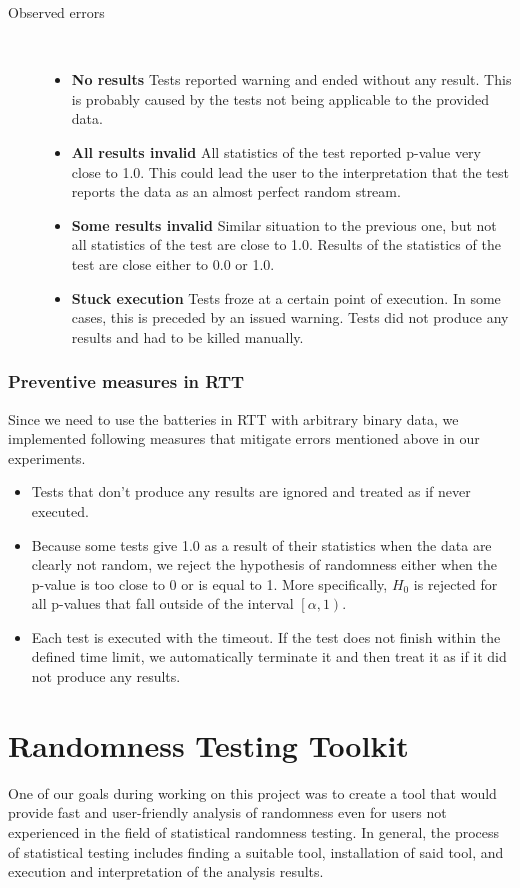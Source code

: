 \documentclass[
	digital,    %
	oneside,
	color,
	11pt,
	nocover,
	notable,
	nolof,
	nolot,
]{fithesis3}
\newenvironment{titlemize}[1]
{
	\begin{description}
	\item[#1]\
	\begin{itemize}
}
{
	\end{itemize}
 	\end{description}
}
\theoremstyle{definition}
\theoremstyle{remark}
\begin{document}
\begin{titlemize}{Observed errors}
\item \textbf{No results} Tests reported warning and ended without any result. This is probably caused by the tests not being applicable to the provided data.
\item \textbf{All results invalid}  All statistics of the test reported p-value very close to 1.0. This could lead the user to the interpretation that the test reports the data as an almost perfect random stream.
\item \textbf{Some results invalid} Similar situation to the previous one, but not all statistics of the test are close to 1.0. Results of the statistics of the test are close either to  0.0 or 1.0.
\item \textbf{Stuck execution} Tests froze at a certain point of execution. In some cases, this is preceded by an issued warning. Tests did not produce any results and had to be killed manually.
\end{titlemize}

\subsection{Preventive measures in RTT}
\label{sec:preventive_measures_rtt}
Since we need to use the batteries in RTT with arbitrary binary data, we implemented following measures that mitigate errors mentioned above in our experiments.
\begin{itemize}
\item Tests that don't produce any results are ignored and treated as if never executed.
\item Because some tests give 1.0 as a result of their statistics when the data are clearly not random, we reject the hypothesis of randomness either when the p-value is too close to 0 or is equal to 1. More specifically, $H_0$ is rejected for all p-values that fall outside of the interval $\left[\alpha, 1\right)$.
\item Each test is executed with the timeout. If the test does not finish within the defined time limit, we automatically terminate it and then treat it as if it did not produce any results.
\end{itemize}

\chapter{Randomness Testing Toolkit}
\label{chap:rtt}
One of our goals during working on this project was to create a tool that would provide fast and user-friendly analysis of randomness even for users not experienced in the field of statistical randomness testing. In general, the process of statistical testing includes finding a suitable tool, installation of said tool, and execution and interpretation of the analysis results.
\end{document}
